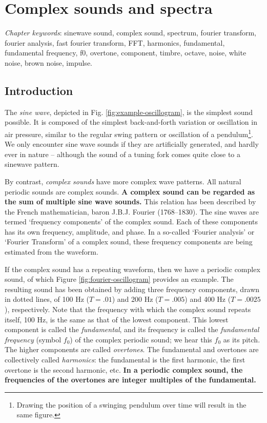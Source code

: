 \documentclass[
]{book}
\begin{document}
\chapter{Complex sounds and spectra}\label{complex-sounds-and-spectra}

\emph{Chapter keywords}: sinewave sound, complex sound, spectrum, fourier transform, fourier analysis, fast fourier transform, FFT, harmonics, fundamental, fundamental frequency, f0, overtone, component, timbre, octave, noise, white noise, brown noise, impulse.

\section{Introduction}\label{sec:FTintro}

The \emph{sine wave}, depicted in Fig. \ref{fig:example-oscillogram}, is the simplest sound possible. It is composed of the simplest back-and-forth variation or oscillation in air pressure, similar to the regular swing pattern or oscillation of a pendulum\footnote{Drawing the position of a swinging pendulum over time will result in the same figure.}. We only encounter sine wave sounds if they are artificially generated, and hardly ever in nature -- although the sound of a tuning fork comes quite close to a sinewave pattern.

By contrast, \emph{complex sounds} have more complex wave patterns. All natural periodic sounds are complex sounds. \textbf{A complex sound can be regarded as the sum of multiple sine wave sounds.} This relation has been described by the French mathematician, baron J.B.J. Fourier (1768--1830). The sine waves are termed `frequency components' of the complex sound. Each of these components has its own frequency, amplitude, and phase. In a so-called `Fourier analysis' or `Fourier Transform' of a complex sound, these frequency components are being estimated from the waveform.

If the complex sound has a repeating waveform, then we have a periodic complex sound, of which Figure \ref{fig:fourier-oscillogram} provides an example. The resulting sound has been obtained by adding three frequency components, drawn in dotted lines, of 100 Hz (\(T=.01\)) and 200 Hz (\(T=.005\)) and 400 Hz (\(T=.0025\)), respectively. Note that the frequency with which the complex sound repeats itself, 100 Hz, is the same as that of the lowest component. This lowest component is called the \emph{fundamental}, and its frequency is called the \emph{fundamental frequency} (symbol \(f_0\)) of the complex periodic sound; we hear this \(f_0\) as its pitch. The higher components are called \emph{overtones}. The fundamental and overtones are collectively called \emph{harmonics}: the fundamental is the first harmonic, the first overtone is the second harmonic, etc.
\textbf{In a periodic complex sound, the frequencies of the overtones are integer multiples of the fundamental.}
\end{document}
